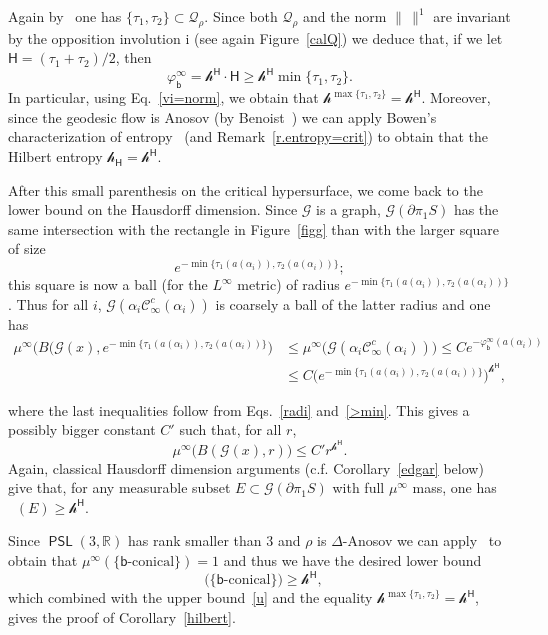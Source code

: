 \documentclass[AHL,Unicode,longabstracts,MathTools]{cedram}
\DeclareMathOperator{\Hff}{dim_{Hf{}f}}
\newcommand{\ii}{\mathrm{i}}
\newcommand{\cartan}{a}
\DeclareMathOperator{\PSL}{{\mathsf{PSL}}}
\newcommand{\scr}{\mathscr}
\newcommand{\hJ}[1]{{\scr h}_{#1}}
\newcommand{\hC}[1]{{\scr h}^{#1}}
\renewcommand{\varXi}{\mathscr{G}}
\renewcommand{\sf}[1]{{\mathsf{#1}}}
\renewcommand{\flat}{\sf{b}}
\newcommand{\cal}{\mathcal}
\newcommand{\cone}{\cal{C}}
\newcommand{\calQ}{\mathcal{Q}}
\newcommand{\R}{\mathbb{R}}
\newcommand{\bord}{\partial}
\newcommand{\piS}{\pi_1S}
\newcommand{\ps}{\mu}
\newcommand{\simple}{{\sf \Delta}}
\newcommand{\slroot}{{\tau}}
\renewcommand{\/}{\backslash}
\newcommand{\<}{\langle}
\renewcommand{\>}{\rangle}
\begin{document}
\pagebreak{}
Again by~\cite{exponentecritico} one has $\{\slroot_1,\slroot_2\}\subset\calQ_\rho$. Since both $\calQ_\rho$ and the norm $\|\,\|^1$ are invariant by the opposition involution $\ii$ (see again Figure~\ref{calQ}) we deduce that, if we let $\sf H=(\slroot_1+\slroot_2)/2$, then
\begin{equation}\label{>min}
\varphi^\infty_\flat=\hC{\sf H}\cdot\sf H\geq \hC{\sf H}\min\{\slroot_1,\slroot_2\}.
\end{equation}
In particular, using Eq.~\eqref{vi=norm}, we obtain that $\hC{\max\{\slroot_1,\slroot_2\}}=\hC{\sf H}$. Moreover, since the geodesic flow is Anosov (by Benoist~\cite{convexes1}) we can apply Bowen's characterization of entropy~\cite{axiomA} (and Remark~\ref{r.entropy=crit}) to obtain that the Hilbert entropy $\hJ{\sf H}=\hC{\sf H}$.


After this small parenthesis on the critical hypersurface, we come back to the lower bound on the Hausdorff dimension. Since $\varXi$ is a graph, $\varXi(\bord\piS)$ has the same intersection with the rectangle in Figure~\ref{figg} than with the larger square of size
\[
e^{-\min\{\slroot_1(\cartan(\alpha_i)),\slroot_2(\cartan(\alpha_i))\}};
\]
this square is now a ball (for the $L^\infty$ metric) of radius $e^{-\min\{\slroot_1(\cartan(\alpha_i)),\slroot_2(\cartan(\alpha_i))\}}$. Thus for all $i$, $\varXi(\alpha_i\cone^{c}_\infty(\alpha_i))$ is coarsely a ball of the latter radius and one has
\begin{align*}
\ps^\infty\bigl(B(\varXi(x),e^{-\min\{\slroot_1(\cartan(\alpha_i)),\slroot_2(\cartan(\alpha_i))\}}\bigr) & \leq \ps^\infty\bigl(\varXi(\alpha_i\cone^{c}_\infty(\alpha_i))\bigr)\leq Ce^{-\varphi^\infty_\flat(\cartan(\alpha_i))}\\
& \leq C\bigl(e^{-\min\{\slroot_1(\cartan(\alpha_i)),\slroot_2(\cartan(\alpha_i))\}}\bigr)^{\hC{\sf H}},
\end{align*}

\noindent where the last inequalities follow from Eqs.~\eqref{radi} and~\eqref{>min}. This gives a possibly bigger constant $C'$ such that, for all $r$,
\[
\ps^\infty\big(B(\varXi(x),r)\big)\leq C'r^{\hC{\sf H}}.
\]
Again, classical Hausdorff dimension arguments (c.f. Corollary~\ref{edgar} below) give that, for any measurable subset $E\subset\varXi(\bord\piS)$ with full $\ps^\infty$ mass, one has $\Hff(E)\geq \hC{\sf H}$.


Since $\PSL(3,\R)$ has rank smaller than 3 and $\rho$ is $\simple$-Anosov we can apply~\cite[Theorem~1.6]{BLLO}
to obtain that $\ps^\infty(\{\flat\text{-conical}\})=1$ and thus we have the desired lower bound
\[
\Hff\bigl(\{\flat\text{-conical}\}\bigr)\geq \hC{\sf H},
\]
which combined with the upper bound~\eqref{u} and the equality $\hC{\max\{\slroot_1,\slroot_2\}}=\hC{\sf H}$, gives the proof of Corollary~\ref{hilbert}.
\end{document}
